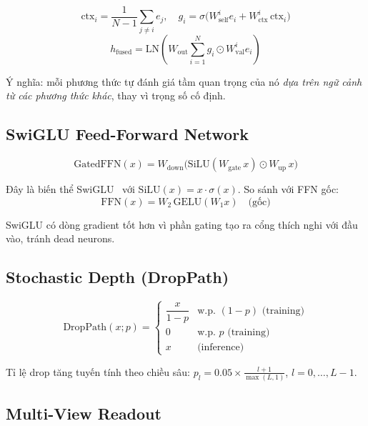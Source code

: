 \documentclass[12pt,a4paper]{article}
\begin{document}
\begin{equation}
  \text{ctx}_i = \frac{1}{N-1}\sum_{j \ne i} e_j,
  \quad g_i = \sigma\bigl(W_\text{self}^i e_i + W_\text{ctx}^i \,\text{ctx}_i\bigr)
\end{equation}
\begin{equation}
  \boxed{h_\text{fused} = \text{LN}\!\left(W_\text{out}\sum_{i=1}^{N} g_i \odot W_\text{val}^i e_i\right)}
\end{equation}

Ý nghĩa: mỗi phương thức tự đánh giá tầm quan trọng của nó \emph{dựa trên
ngữ cảnh từ các phương thức khác}, thay vì trọng số cố định.

\subsection{SwiGLU Feed-Forward Network}

\begin{equation}
  \text{GatedFFN}(x) = W_\text{down}\bigl(\text{SiLU}(W_\text{gate}\,x) \odot W_\text{up}\,x\bigr)
  \label{eq:swiglu}
\end{equation}

Đây là biến thể SwiGLU~\cite{shazeer2020glu} với $\text{SiLU}(x) = x \cdot \sigma(x)$.
So sánh với FFN gốc:
\begin{equation}
  \text{FFN}(x) = W_2\,\text{GELU}(W_1 x) \quad \text{(gốc)}
\end{equation}

SwiGLU có dòng gradient tốt hơn vì phần gating tạo ra cổng thích nghi với
đầu vào, tránh dead neurons.

\subsection{Stochastic Depth (DropPath)}

\begin{equation}
  \text{DropPath}(x; p) = \begin{cases}
    \dfrac{x}{1-p} & \text{w.p. } (1-p) \text{ (training)}\\
    0 & \text{w.p. } p \text{ (training)}\\
    x & \text{(inference)}
  \end{cases}
  \label{eq:droppath}
\end{equation}

Tỉ lệ drop tăng tuyến tính theo chiều sâu:
$p_l = 0.05 \times \frac{l+1}{\max(L,1)}$, $l = 0,\ldots,L-1$.

\subsection{Multi-View Readout}
\end{document}
